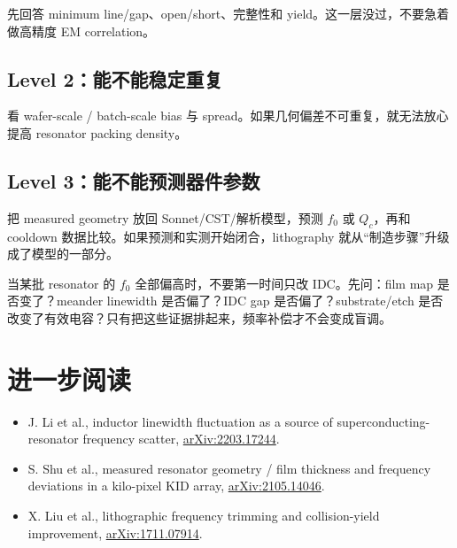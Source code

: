 先回答 minimum line/gap、open/short、完整性和 yield。这一层没过，不要急着做高精度 EM correlation。

\subsection{Level 2：能不能稳定重复}

看 wafer-scale / batch-scale bias 与 spread。如果几何偏差不可重复，就无法放心提高 resonator packing density。

\subsection{Level 3：能不能预测器件参数}

把 measured geometry 放回 Sonnet/CST/解析模型，预测 $f_0$ 或 $Q_c$，再和 cooldown 数据比较。如果预测和实测开始闭合，lithography 就从“制造步骤”升级成了模型的一部分。

\begin{checkpointbox}
当某批 resonator 的 $f_0$ 全部偏高时，不要第一时间只改 IDC。先问：film map 是否变了？meander linewidth 是否偏了？IDC gap 是否偏了？substrate/etch 是否改变了有效电容？只有把这些证据排起来，频率补偿才不会变成盲调。
\end{checkpointbox}

\section*{进一步阅读}

\begin{itemize}
  \item J. Li et al., inductor linewidth fluctuation as a source of superconducting-resonator frequency scatter, \href{https://arxiv.org/abs/2203.17244}{arXiv:2203.17244}.
  \item S. Shu et al., measured resonator geometry / film thickness and frequency deviations in a kilo-pixel KID array, \href{https://arxiv.org/abs/2105.14046}{arXiv:2105.14046}.
  \item X. Liu et al., lithographic frequency trimming and collision-yield improvement, \href{https://arxiv.org/abs/1711.07914}{arXiv:1711.07914}.
\end{itemize}
